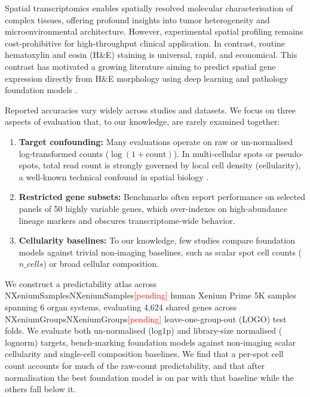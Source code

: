 \documentclass[10pt,twocolumn]{article}
\providecommand{\pending}{\textcolor{red}{[pending]}}
\newcommand{\num}[1]{\ifcsname #1\endcsname\csname #1\endcsname\else\pending\fi}
\begin{document}
Spatial transcriptomics enables spatially resolved molecular characterisation of complex tissues, offering profound insights into tumor heterogeneity and microenvironmental architecture. However, experimental spatial profiling remains cost-prohibitive for high-throughput clinical application. In contrast, routine hematoxylin and eosin (H\&E) staining is universal, rapid, and economical. This contrast has motivated a growing literature aiming to predict spatial gene expression directly from H\&E morphology using deep learning \citep{he2020integrating,pang2021leveraging,xie2023bleep,hoang2024deeppt} and pathology foundation models \citep{jaume2024hest,chen2024uni,vorontsov2024virchow}.

Reported accuracies vary widely across studies and datasets. We focus on three aspects of evaluation that, to our knowledge, are rarely examined together:
\begin{enumerate}
    \item \textbf{Target confounding:} Many evaluations operate on raw or un-normalised log-transformed counts ($\log(1+\text{count})$). In multi-cellular spots or pseudo-spots, total read count is strongly governed by local cell density (cellularity), a well-known technical confound in spatial biology \citep{hafemeister2019normalization,kleshchevnikov2022cell2location}.
    \item \textbf{Restricted gene subsets:} Benchmarks often report performance on selected panels of 50 highly variable genes, which over-indexes on high-abundance lineage markers and obscures transcriptome-wide behavior.
    \item \textbf{Cellularity baselines:} To our knowledge, few studies compare foundation models against trivial non-imaging baselines, such as scalar spot cell counts ($n\_cells$) or broad cellular composition.
\end{enumerate}

We construct a predictability atlas across \num{NXeniumSamples} human Xenium Prime 5K samples spanning 6 organ systems, evaluating 4{,}624 shared genes across \num{NXeniumGroups} leave-one-group-out (LOGO) test folds. We evaluate both un-normalised ($\text{log1p}$) and library-size normalised ($\text{lognorm}$) targets, bench-marking foundation models against non-imaging scalar cellularity and single-cell composition baselines. We find that a per-spot cell count accounts for much of the raw-count predictability, and that after normalisation the best foundation model is on par with that baseline while the others fall below it.
\end{document}
